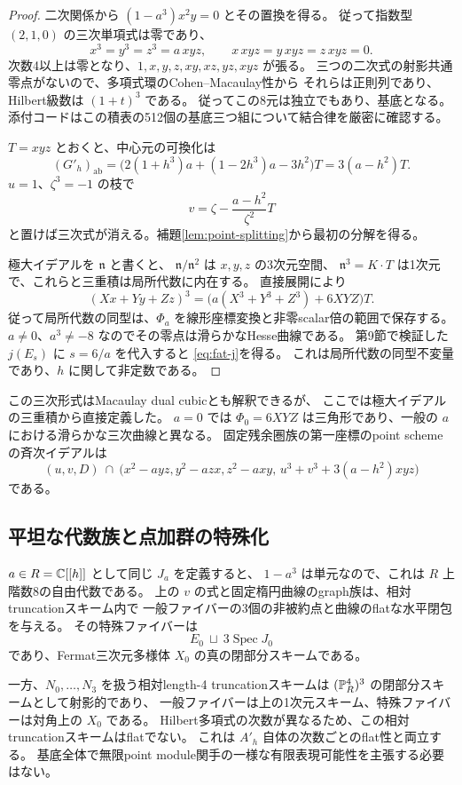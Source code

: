 \begin{proof}
二次関係から $(1-a^3)x^2y=0$ とその置換を得る。
従って指数型 $(2,1,0)$ の三次単項式は零であり、
\[
 x^3=y^3=z^3=a\,xyz,\qquad
 x\,xyz=y\,xyz=z\,xyz=0.
\]
次数4以上は零となり、$1,x,y,z,xy,xz,yz,xyz$ が張る。
三つの二次式の射影共通零点がないので、多項式環のCohen--Macaulay性から
それらは正則列であり、Hilbert級数は $(1+t)^3$ である。
従ってこの8元は独立でもあり、基底となる。
添付コードはこの積表の512個の基底三つ組について結合律を厳密に確認する。

$T=xyz$ とおくと、中心元の可換化は
\[
 (G'_h)_{\mathrm{ab}}
 =\bigl(2(1+h^3)a+(1-2h^3)a-3h^2\bigr)T
 =3(a-h^2)T.
\]
$u=1$、$\zeta^3=-1$ の枝で
\[
 v=\zeta-\frac{a-h^2}{\zeta^2}T
\]
と置けば三次式が消える。補題\ref{lem:point-splitting}から最初の分解を得る。

極大イデアルを $\mathfrak n$ と書くと、
$\mathfrak n/\mathfrak n^2$ は $x,y,z$ の3次元空間、
$\mathfrak n^3=K\cdot T$ は1次元で、これらと三重積は局所代数に内在する。
直接展開により
\[
 (Xx+Yy+Zz)^3
 =\bigl(a(X^3+Y^3+Z^3)+6XYZ\bigr)T.
\]
従って局所代数の同型は、$\Phi_a$ を線形座標変換と非零scalar倍の範囲で保存する。
$a\ne0$、$a^3\ne-8$ なのでその零点は滑らかなHesse曲線である。
第9節で検証した $j(E_s)$ に $s=6/a$ を代入すると
\eqref{eq:fat-j}を得る。
これは局所代数の同型不変量であり、$h$ に関して非定数である。
\end{proof}

この三次形式はMacaulay dual cubicとも解釈できるが、
ここでは極大イデアルの三重積から直接定義した。
$a=0$ では $\Phi_0=6XYZ$ は三角形であり、一般の $a$ における滑らかな三次曲線と異なる。
固定残余圏族の第一座標のpoint schemeの斉次イデアルは
\[
 (u,v,D)\ \cap\
 \bigl(x^2-a yz,y^2-a zx,z^2-a xy,\,
 u^3+v^3+3(a-h^2)xyz\bigr)
\]
である。

\subsection{平坦な代数族と点加群の特殊化}

$a\in R=\mathbb C[[h]]$ として同じ $J_a$ を定義すると、
$1-a^3$ は単元なので、これは $R$ 上階数8の自由代数である。
上の $v$ の式と固定楕円曲線のgraph族は、相対truncationスキーム内で
一般ファイバーの3個の非被約点と曲線のflatな水平閉包を与える。
その特殊ファイバーは
\[
 E_0\ \sqcup\ 3\operatorname{Spec}J_0
\]
であり、Fermat三次元多様体 $X_0$ の真の閉部分スキームである。

一方、$N_0,\ldots,N_3$ を扱う相対length-4 truncationスキームは
$(\mathbb P^4_R)^3$ の閉部分スキームとして射影的であり、
一般ファイバーは上の1次元スキーム、特殊ファイバーは対角上の $X_0$ である。
Hilbert多項式の次数が異なるため、この相対truncationスキームはflatでない。
これは $A'_h$ 自体の次数ごとのflat性と両立する。
基底全体で無限point module関手の一様な有限表現可能性を主張する必要はない。

